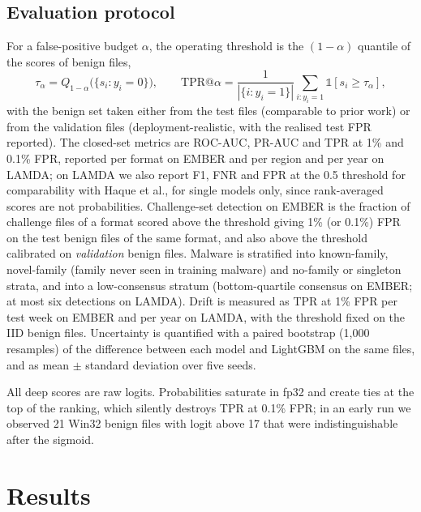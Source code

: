 \documentclass[fleqn,10pt]{wlscirep}
\newcommand{\lgbm}{LightGBM}
\begin{document}
\subsection{Evaluation protocol}
\label{sec:eval}
For a false-positive budget $\alpha$, the operating threshold is the $(1-\alpha)$ quantile of the scores of benign files,
\begin{equation}
\tau_\alpha = Q_{1-\alpha}\big(\{ s_i : y_i = 0 \}\big), \qquad \mathrm{TPR}@\alpha = \frac{1}{|\{i: y_i = 1\}|} \sum_{i : y_i = 1} \mathbb{1}[s_i \ge \tau_\alpha],
\label{eq:tpr}
\end{equation}
with the benign set taken either from the test files (comparable to prior work) or from the validation files (deployment-realistic, with the realised test FPR reported). The closed-set metrics are ROC-AUC, PR-AUC and TPR at 1\% and 0.1\% FPR, reported per format on EMBER and per region and per year on LAMDA; on LAMDA we also report F1, FNR and FPR at the 0.5 threshold for comparability with Haque et al.\cite{haque2026lamda}, for single models only, since rank-averaged scores are not probabilities. Challenge-set detection on EMBER is the fraction of challenge files of a format scored above the threshold giving 1\% (or 0.1\%) FPR on the test benign files of the same format, and also above the threshold calibrated on \emph{validation} benign files. Malware is stratified into known-family, novel-family (family never seen in training malware) and no-family or singleton strata, and into a low-consensus stratum (bottom-quartile consensus on EMBER; at most six detections on LAMDA). Drift is measured as TPR at 1\% FPR per test week on EMBER and per year on LAMDA, with the threshold fixed on the IID benign files. Uncertainty is quantified with a paired bootstrap (1,000 resamples) of the difference between each model and \lgbm{} on the same files, and as mean $\pm$ standard deviation over five seeds.

All deep scores are raw logits. Probabilities saturate in fp32 and create ties at the top of the ranking, which silently destroys TPR at 0.1\% FPR; in an early run we observed 21 Win32 benign files with logit above 17 that were indistinguishable after the sigmoid.

\section{Results}
\label{sec:results}
\end{document}
